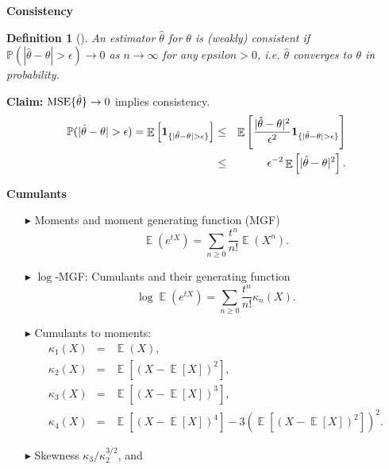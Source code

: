 \documentclass[19pt,landscaoe]{article}
\newtheorem{defi}[thm]{Definition}
\newcommand{\IP}{\mathbb{P}}
\newcommand{\bone}{{\bf 1}}
\DeclareMathOperator{\E}{\mathbb{E}}
\begin{document}
\newpage
{\LARGE\centerline{\textbf{Consistency}}}
\vskip25pt
\begin{minipage}{.9\textwidth}
    \Large 
\begin{defi}[\cite{garthwaite02}]
    An estimator $\hat{\theta}$ for $\theta$ is (weakly) consistent if $\IP(|\hat{\theta}-\theta|>\epsilon)\to0$ as $n\to\infty$ for any $epsilon>0$, i.e. $\hat{\theta}$ converges to $\theta$ in probability.
\end{defi} 
{\bf Claim:} ${\rm MSE}\{\hat{\theta}\}\to0$ implies consistency. 
\begin{eqnarray*}
    \IP(|\hat{\theta}-\theta|>\epsilon)=\E\left[\bone_{\{|\hat{\theta}-\theta|>\epsilon\}}\right]&\le&\E\left[\frac{|\hat{\theta}-\theta|^2}{\epsilon^2}\bone_{\{|\hat{\theta}-\theta|>\epsilon\}}\right]\\
    &\le&\epsilon^{-2}\E\left[|\hat{\theta}-\theta|^2\right].
\end{eqnarray*}
\end{minipage}

\newpage
{\LARGE\centerline{\textbf{Cumulants}}}
\vskip25pt
\begin{minipage}{.9\textwidth}
    \large 
  \begin{itemize}
    \item[$\blacktriangleright$] Moments and moment generating function (MGF)
    \begin{equation*}
        \E\left(e^{tX}\right)=\sum_{n\ge0}\frac{t^n}{n!}\E(X^n).
    \end{equation*}
    \item[$\blacktriangleright$] $\log$-MGF: Cumulants and their generating function
\begin{equation*}
    \log\E\left(e^{tX}\right)=\sum_{n\ge0}\frac{t^n}{n!}\kappa_n(X).
\end{equation*}
    \item[$\blacktriangleright$] Cumulants to moments:
\begin{eqnarray}
    \kappa_1(X)&=&\E(X),\nonumber\\
    \kappa_2(X)&=&\E[(X-\E[X])^2],\nonumber\\
    \kappa_3(X)&=&\E[(X-\E[X])^3],\nonumber\\
    \kappa_4(X)&=&\E[(X-\E[X])^4]-3(\E[(X-\E[X])^2])^2.\nonumber
\end{eqnarray}
    \item[$\blacktriangleright$] Skewness  $\kappa_3/\kappa_2^{3/2}$, and 
  \end{itemize}
\end{minipage}
\end{document}
